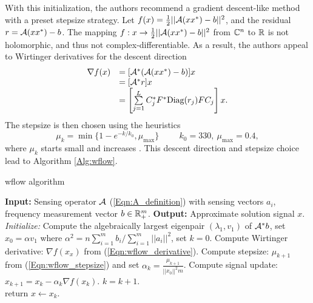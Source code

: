 With this initialization, the authors recommend a gradient descent-like method with a preset stepsize strategy.  Let $f(x) = \frac{1}{2}||{\mathcal A}(xx^*) - b||^2$, and the residual $r = {\mathcal A}(xx^*) - b$.  The mapping $f: x \rightarrow \frac{1}{2}||{\mathcal A}(xx^*) - b||^2$ from ${\mathbb C}^n$ to ${\mathbb R}$ is not holomorphic, and thus not complex-differentiable.  As a result, the authors appeal to Wirtinger derivatives \cite[Section 6]{DBLP:journals/tit/CandesLS15} for the descent direction
\begin{equation}			\label{Eqn:wflow_derivative}
\begin{array}{ll}
\nabla f(x)
	&	= [{\mathcal A}^*({\mathcal A}(xx^*) - b)]x
		\\
	&	= [{\mathcal A}^*r]x
		\\
	& = \left[ \sum\limits_{\substack{j=1}}^{\substack{L}}
					C_j^* F^* \textnormal{Diag}(r_j) F C_j \right] x.
\end{array}
\end{equation}
The stepsize is then chosen using the heuristics
 \begin{equation} 			\label{Eqn:wflow_stepsize}
\mu_k = \min \{ 1-e^{-k/k_0}, \mu_{\max} \} \hspace{1cm} k_0 = 330, \ \mu_{\max} = 0.4,
\end{equation}
where $\mu_k$ starts small and increases  \cite[Section 2]{DBLP:journals/tit/CandesLS15}.  This descent direction and stepsize choice lead to Algorithm \ref{Alg:wflow}.

\begin{algorithm}[H]
\caption{wflow algorithm}	\label{Alg:wflow}

\begin{algorithmic}[1]
	\Statex 	\textbf{Input:} Sensing operator ${\mathcal A}$ (\ref{Eqn:A_definition}) with sensing vectors $a_i$, frequency measurement vector $b \in {\mathbb R}^m_+$.
	\Statex 	\textbf{Output:} Approximate solution signal $x$.
	\State 		\textit{Initialize:} Compute the algebraically largest eigenpair $(\lambda_1, v_1)$ of ${\mathcal A}^*b$, set $x_0 = \alpha v_1$ where $\alpha^2 =  n \sum_{i=1}^mb_i / \sum_{i=1}^m ||a_i||^2$, set $k = 0$.
		\State	Compute Wirtinger derivative: $\nabla f(x_x)$ from (\ref{Eqn:wflow_derivative}).
		\State	Compute stepsize: $\mu_{k+1}$ from (\ref{Eqn:wflow_stepsize}) and set $\alpha_k = \frac{\mu_{k+1}}{||x_0||^2 m}$.
		\State 	Compute signal update: $x_{k+1} = x_k - \alpha_k \nabla f(x_k)$.
		\State	$k = k + 1$.
	\EndWhile	\\
	return $x \leftarrow x_k$.
\end{algorithmic}
\end{algorithm}


